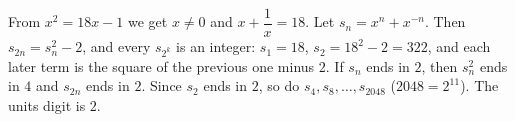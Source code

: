 From $x^2=18x-1$ we get $x\ne0$ and $x+\dfrac{1}{x}=18$. Let $s_n=x^n+x^{-n}$. Then $s_{2n}=s_n^2-2$, and every $s_{2^k}$ is an integer: $s_1=18$, $s_2=18^2-2=322$, and each later term is the square of the previous one minus $2$. If $s_n$ ends in $2$, then $s_n^2$ ends in $4$ and $s_{2n}$ ends in $2$. Since $s_2$ ends in $2$, so do $s_4,s_8,\dots,s_{2048}$ ($2048=2^{11}$). The units digit is $\boxed{2}$.
